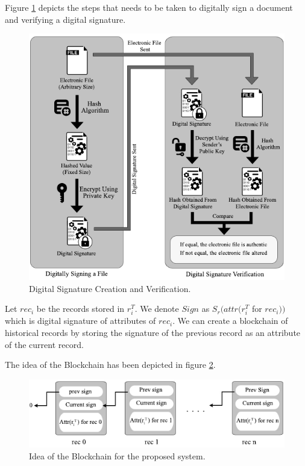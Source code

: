		Figure \ref{fig:DigitalSignature} depicts the steps that needs to be taken to digitally sign a document and verifying a digital signature.\\
		\begin{figure}
			\centering
			\includegraphics[width=\textwidth]{figs/digital_signature.pdf}
			\caption{Digital Signature Creation and Verification.}
			\label{fig:DigitalSignature}
		\end{figure}
		\begin{defn}[Blockchain] 
			Let $rec_i$ be the records stored in $r_i^T$. We denote $Sign$ as $S_r(attr(r_i^T$ for $rec_i))$ which is digital signature of attributes of $rec_i$. We can create a blockchain of historical records by storing the signature of the previous record as an attribute of the current record.
		\end{defn}
		The idea of the Blockchain has been depicted in figure \ref{fig:Blockchain}.
		\begin{figure}
			\centering
			\includegraphics[width=\textwidth]{figs/blockchain.pdf}
			\caption{Idea of the Blockchain for the proposed system.}
			\label{fig:Blockchain}
		\end{figure}

